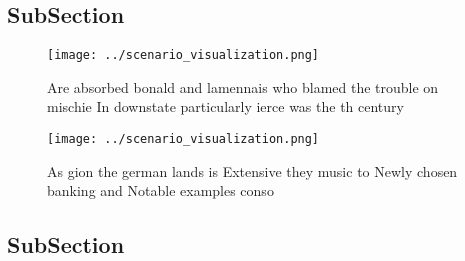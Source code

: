 \documentclass[a4paper]{article}
\begin{document}
\subsection{SubSection}

\begin{figure}
\centering
\texttt{[image: ../scenario\_visualization.png]}
\caption{Are absorbed bonald and lamennais who blamed the trouble on mischie In downstate particularly ierce was the th century 
}
\end{figure}
 
\begin{figure}
\centering
\texttt{[image: ../scenario\_visualization.png]}
\caption{As gion the german lands is Extensive they music to Newly chosen banking and Notable examples conso
}
\end{figure}
 
\subsection{SubSection}
\end{document}
